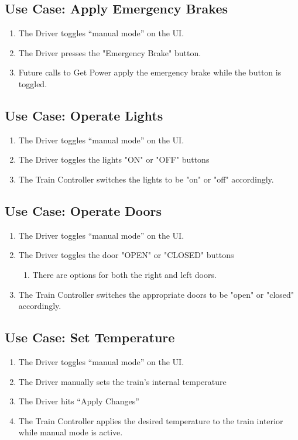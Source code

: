 \documentclass{scrreprt}
\begin{document}
\subsection{Use Case: Apply Emergency Brakes}
\begin{enumerate}
	\item The Driver toggles “manual mode” on the UI.
	\item The Driver presses the "Emergency Brake" button.
	\item Future calls to Get Power apply the emergency brake while the button is toggled.
\end{enumerate}

\subsection{Use Case: Operate Lights}
\begin{enumerate}
	\item The Driver toggles “manual mode” on the UI.
	\item The Driver toggles the lights "ON" or "OFF" buttons
	\item The Train Controller switches the lights to be "on" or "off" accordingly.
\end{enumerate}

\subsection{Use Case: Operate Doors}
\begin{enumerate}
	\item The Driver toggles “manual mode” on the UI.
	\item The Driver toggles the door "OPEN" or "CLOSED" buttons
	\begin{enumerate}
		\item There are options for both the right and left doors.
	\end{enumerate}
	\item The Train Controller switches the appropriate doors to be "open" or "closed" accordingly.
\end{enumerate}

\subsection{Use Case: Set Temperature}
\begin{enumerate}
	\item The Driver toggles “manual mode” on the UI.
	\item The Driver manually sets the train's internal temperature
	\item The Driver hits “Apply Changes”
	\item The Train Controller applies the desired temperature to the train interior while manual mode is active.
\end{enumerate}
\end{document}
